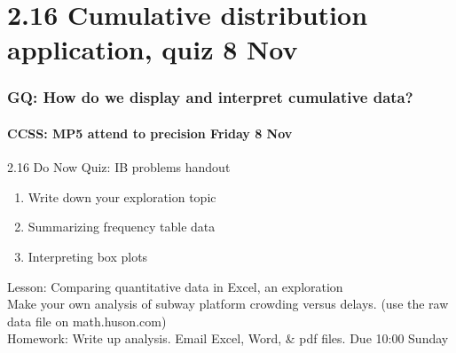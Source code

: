 \documentclass{beamer}
\begin{document}
\section{2.16 Cumulative distribution application, quiz 8 Nov}
\frame
{
  \frametitle{GQ: How do we display and interpret cumulative data?}
  \framesubtitle{CCSS: MP5 attend to precision \hfill \alert{Friday 8 Nov}}

  \begin{block}{2.16 Do Now Quiz: IB problems handout}
  \begin{enumerate}
      \item Write down your exploration topic 
      \item Summarizing frequency table data
      \item Interpreting box plots
  \end{enumerate}
  \end{block}
  Lesson: Comparing quantitative data in Excel, an exploration\\
  Make your own analysis of subway platform crowding versus delays. (use the raw data file on math.huson.com) \\ \smallskip
  Homework: Write up analysis. Email Excel, Word, \& pdf files. Due 10:00 Sunday
}
\end{document}
